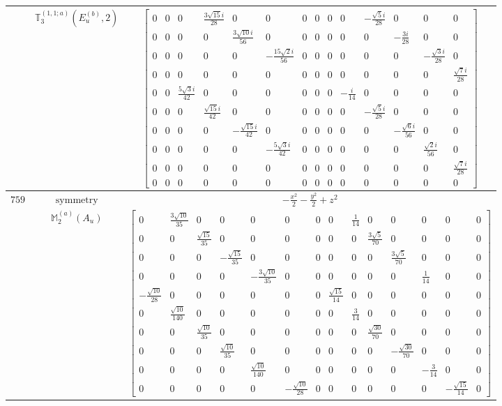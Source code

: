 \documentclass[fleqn,8pt,landscape]{jsarticle}
\begin{document}
\begin{longtable}{ccc}
$  $ & $ \mathbb{T}_{3}^{(1,1;a)}(E_{u}^{(b)},2) $ & $ \begin{bmatrix} 0 & 0 & 0 & \frac{3 \sqrt{15} i}{28} & 0 & 0 & 0 & 0 & 0 & 0 & - \frac{\sqrt{5} i}{28} & 0 & 0 & 0 \\ 0 & 0 & 0 & 0 & \frac{3 \sqrt{10} i}{56} & 0 & 0 & 0 & 0 & 0 & 0 & - \frac{3 i}{28} & 0 & 0 \\ 0 & 0 & 0 & 0 & 0 & - \frac{15 \sqrt{2} i}{56} & 0 & 0 & 0 & 0 & 0 & 0 & - \frac{\sqrt{3} i}{28} & 0 \\ 0 & 0 & 0 & 0 & 0 & 0 & 0 & 0 & 0 & 0 & 0 & 0 & 0 & \frac{\sqrt{7} i}{28} \\ 0 & 0 & \frac{5 \sqrt{3} i}{42} & 0 & 0 & 0 & 0 & 0 & 0 & - \frac{i}{14} & 0 & 0 & 0 & 0 \\ 0 & 0 & 0 & \frac{\sqrt{15} i}{42} & 0 & 0 & 0 & 0 & 0 & 0 & - \frac{\sqrt{5} i}{28} & 0 & 0 & 0 \\ 0 & 0 & 0 & 0 & - \frac{\sqrt{15} i}{42} & 0 & 0 & 0 & 0 & 0 & 0 & - \frac{\sqrt{6} i}{56} & 0 & 0 \\ 0 & 0 & 0 & 0 & 0 & - \frac{5 \sqrt{3} i}{42} & 0 & 0 & 0 & 0 & 0 & 0 & \frac{\sqrt{2} i}{56} & 0 \\ 0 & 0 & 0 & 0 & 0 & 0 & 0 & 0 & 0 & 0 & 0 & 0 & 0 & \frac{\sqrt{7} i}{28} \\ 0 & 0 & 0 & 0 & 0 & 0 & 0 & 0 & 0 & 0 & 0 & 0 & 0 & 0 \end{bmatrix} $ \\ \hline
$ 759 $ & $ \text{symmetry} $ & $ - \frac{x^{2}}{2} - \frac{y^{2}}{2} + z^{2} $ \\
$  $ & $ \mathbb{M}_{2}^{(a)}(A_{u}) $ & $ \begin{bmatrix} 0 & \frac{3 \sqrt{10}}{35} & 0 & 0 & 0 & 0 & 0 & 0 & \frac{1}{14} & 0 & 0 & 0 & 0 & 0 \\ 0 & 0 & \frac{\sqrt{15}}{35} & 0 & 0 & 0 & 0 & 0 & 0 & \frac{3 \sqrt{5}}{70} & 0 & 0 & 0 & 0 \\ 0 & 0 & 0 & - \frac{\sqrt{15}}{35} & 0 & 0 & 0 & 0 & 0 & 0 & \frac{3 \sqrt{5}}{70} & 0 & 0 & 0 \\ 0 & 0 & 0 & 0 & - \frac{3 \sqrt{10}}{35} & 0 & 0 & 0 & 0 & 0 & 0 & \frac{1}{14} & 0 & 0 \\ - \frac{\sqrt{10}}{28} & 0 & 0 & 0 & 0 & 0 & 0 & \frac{\sqrt{15}}{14} & 0 & 0 & 0 & 0 & 0 & 0 \\ 0 & \frac{\sqrt{10}}{140} & 0 & 0 & 0 & 0 & 0 & 0 & \frac{3}{14} & 0 & 0 & 0 & 0 & 0 \\ 0 & 0 & \frac{\sqrt{10}}{35} & 0 & 0 & 0 & 0 & 0 & 0 & \frac{\sqrt{30}}{70} & 0 & 0 & 0 & 0 \\ 0 & 0 & 0 & \frac{\sqrt{10}}{35} & 0 & 0 & 0 & 0 & 0 & 0 & - \frac{\sqrt{30}}{70} & 0 & 0 & 0 \\ 0 & 0 & 0 & 0 & \frac{\sqrt{10}}{140} & 0 & 0 & 0 & 0 & 0 & 0 & - \frac{3}{14} & 0 & 0 \\ 0 & 0 & 0 & 0 & 0 & - \frac{\sqrt{10}}{28} & 0 & 0 & 0 & 0 & 0 & 0 & - \frac{\sqrt{15}}{14} & 0 \end{bmatrix} $ \\ \hline

\end{longtable}
\end{document}
